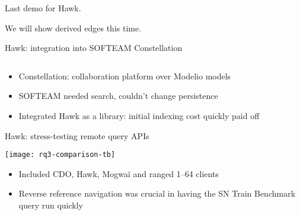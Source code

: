 \begin{frame}[standout]
  Last demo for Hawk.

  We will show derived edges this time.
\end{frame}

\begin{frame}{Hawk: integration into SOFTEAM Constellation~\cite{hawkmodelio_2016}}

  \centering
  \begin{columns}
    

    
  \end{columns}

  \begin{itemize}
  \item Constellation: collaboration platform over Modelio models
  \item SOFTEAM needed search, couldn't change persistence
  \item Integrated Hawk as a library: initial indexing cost quickly paid off
  \end{itemize}
\end{frame}

\begin{frame}{Hawk: stress-testing remote query APIs~\cite{sosym-stress-2017}}

  \begin{center}
    \texttt{[image: rq3-comparison-tb]}
  \end{center}

  \begin{itemize}
  \item Included CDO, Hawk, Mogwaï and ranged 1--64 clients
  \item Reverse reference navigation was crucial in having the
    SN Train Benchmark~\cite{trainbenchmark} query run quickly
  \end{itemize}

\end{frame}

